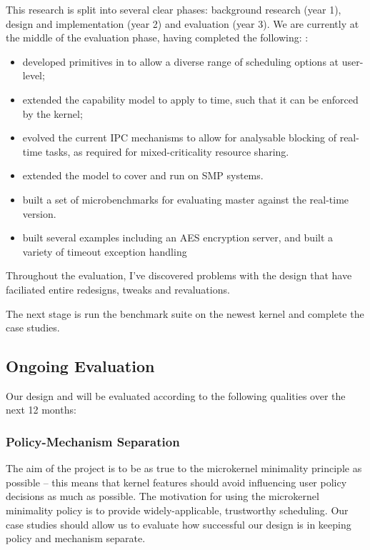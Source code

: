 This research is split into several clear phases: background research (year 1), design and implementation (year 2) and evaluation (year 3).
We are currently at the middle of the evaluation phase, having completed the following:
:
\begin{itemize}
	\item developed primitives in \selfour to allow a diverse range of scheduling options at user-level;
	\item extended the \selfour capability model to apply to time, such that it can be enforced by the kernel;
	\item evolved the current \selfour \gls{IPC} mechanisms to allow for analysable blocking of real-time tasks, as required for mixed-criticality resource sharing.
        \item extended the model to cover and run on \gls{SMP} systems.
        \item built a set of microbenchmarks for evaluating \selfour master against the real-time version.
        \item built several examples including an AES encryption server, and built a variety of timeout exception handling 
\end{itemize}

Throughout the evaluation, I've discovered problems with the design that have faciliated entire redesigns, tweaks and revaluations. 

The next stage is run the benchmark suite on the newest kernel and complete the case studies.

\subsection{Ongoing Evaluation}

Our design and will be evaluated according to the following qualities over the next 12 months:

\subsubsection{Policy-Mechanism Separation}

The aim of the project is to be as true to the microkernel minimality principle as possible -- this means that kernel features should avoid influencing user policy decisions as much as possible.
The motivation for using the microkernel minimality policy is to provide widely-applicable, trustworthy scheduling.
Our case studies should allow us to evaluate how successful our design is in keeping policy and mechanism separate.

